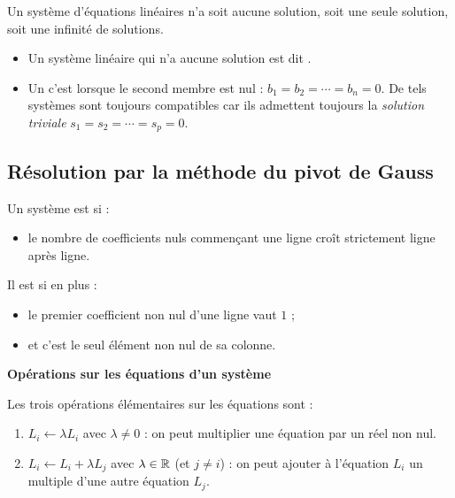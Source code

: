 \documentclass[10pt,class=article,crop=false]{standalone}
\begin{document}
\begin{multicols}{2}
\begin{theoreme}
	Un système d'équations linéaires n'a soit aucune solution,
	soit une seule solution, soit une infinité de solutions.
\end{theoreme}

\begin{itemize}
	\item Un système linéaire qui n'a aucune solution est dit .


	\item Un 
 c'est lorsque le second membre est nul : $b_1=b_2=\cdots=b_n=0$.
De tels systèmes sont toujours compatibles car ils admettent toujours
la \emph{solution triviale} $s_1=s_2=\cdots=s_p=0$. 
\end{itemize}

\subsection{Résolution par la méthode du pivot de Gauss}


	Un système est  si :
	\begin{itemize}
		\item le nombre de coefficients nuls commençant une ligne croît strictement ligne après ligne.
	\end{itemize}
	
	Il est  si en plus :
	\begin{itemize}
		\setcounter{enumi}{1}
		\item le premier coefficient non nul d'une ligne vaut $1$ ;
		
		\item et c'est le seul élément non nul de sa colonne.
	\end{itemize}




\textbf{Opérations sur les équations d'un système}

Les trois opérations élémentaires sur les équations sont :
\begin{enumerate}
	\item $L_i \leftarrow \lambda L_i$ avec $\lambda \neq 0$ :
	on peut multiplier une équation par un réel non nul.
	
	\item $L_i \leftarrow L_i+\lambda L_j$ avec $\lambda \in \mathbb{R}$ (et $j\neq i$) :
	on peut ajouter à l'équation $L_i$ un multiple d'une autre équation $L_j$.
	

\end{enumerate}
\end{multicols}
\end{document}
